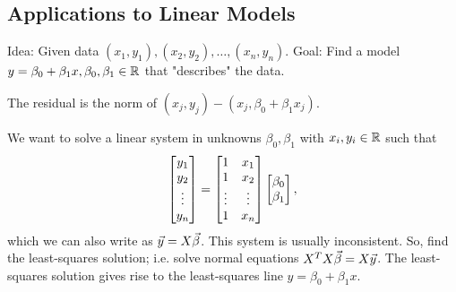 \documentclass[10pt,a4paper]{article}
\begin{document}
\subsection{Applications to Linear Models}

\begin{definition}
	Idea: Given data $(x_1,y_1),(x_2,y_2),\dots,(x_n,y_n)$.
	Goal: Find a model $y=\beta_0+\beta_1x,\beta_0,\beta_1\in\mathbb{R}$ that "describes" the data.
\end{definition}
The residual is the norm of $(x_j,y_j)-(x_j,\beta_0+\beta_1x_j)$.

We want to solve a linear system in unknowns $\beta_0,\beta_1$ with $x_i,y_i\in\mathbb{R}$ such that
$$\begin{bmatrix}y_1\\y_2\\ \vdots\\y_n\end{bmatrix} = \begin{bmatrix}1 & x_1\\1&x_2\\\vdots&\vdots\\1&x_n\end{bmatrix}\begin{bmatrix}\beta_0\\\beta_1\end{bmatrix},$$
which we can also write as $\vec{y}=X\vec{\beta}$.
This system is usually inconsistent. So, find the least-squares solution; i.e. solve normal equations $X^T X\vec{\beta}=X\vec{y}$. The least-squares solution gives rise to the least-squares line $y=\beta_0+\beta_1x$.
\end{document}
